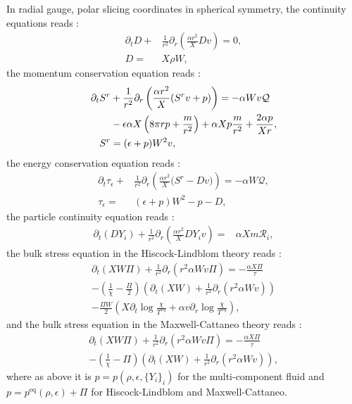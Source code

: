 \documentclass[aps,prd,twocolumn,a4paper,floatfix,nofootbib,superscriptaddress,nofootinbib]{revtex4}
\newcommand{\req}{\mathrm{eq}}
\begin{document}
In radial gauge, polar slicing coordinates in spherical symmetry, the continuity equations reads \cite{Romero96, OConnor10}:
%
\begin{align}
\label{eq:continuity-rho}
\partial_t D
+{}&\frac1{r^2}\partial_r\left(\frac{\alpha r^2}X Dv\right)=0,\\
\label{eq:def-d}
D={}& X\rho W,
\end{align}
%
the momentum conservation equation reads \cite{Romero96, OConnor10}:
%
\begin{align}
\label{eq:conservation-momentum}
\partial_t S^r{}&{}
+\frac1{r^2}\partial_r\left(\frac{\alpha r^2}X (S^rv + p)\right)=- \alpha W v {\mathcal Q}\notag\\
{}&{}-\epsilon\alpha X\left(8\pi rp + \frac{m}{r^2}\right)
+\alpha X p\frac{m}{r^2} + \frac{2\alpha p}{Xr},\\
\label{eq:def-sr}
S^r{}&{}=(\epsilon + p)W^2v,
\end{align}
%
the energy conservation equation reads \cite{Romero96, OConnor10}:
%
\begin{align}
\label{eq:conservation-energy}
\partial_t \tau_\epsilon
+{}&\frac1{r^2}\partial_r\left(\frac{\alpha r^2}X \big(S^r - Dv\big)\right)= -\alpha W \mathcal Q,\\
\label{eq:def-tau}
\tau_\epsilon={}&(\epsilon + p)W^2 - p - D,
\end{align}
%
the particle continuity equation reads \cite{OConnor10}:
\begin{align}
\label{eq:continuity-yi}
\partial_t (DY_i)
+\frac1{r^2}\partial_r\left(\frac{\alpha r^2}X DY_i v\right)={}&\alpha Xm\mathcal R_i,
\end{align}
%
the bulk stress equation in the Hiscock-Lindblom theory reads \cite{Camelio22a}:
%
\begin{multline}
\label{eq:pi-evol-hl}
\partial_t(XW\Pi) + \frac1{r^2}\partial_r\left(r^2\alpha Wv\Pi\right) = -\frac{\alpha X\Pi}{\tau}\\
-\left(\frac1\chi-\frac{\Pi}2\right)\left(\partial_t (XW) +\frac1{r^2}\partial_r(r^2\alpha Wv)\right)\\
-\frac{\Pi W}2\left(X\partial_t\log\frac\chi{T^\req}+\alpha v\partial_r\log\frac\chi{T^\req}\right),
\end{multline}
%
and the bulk stress equation in the Maxwell-Cattaneo theory reads \cite{Camelio22a}:
%
\begin{multline}
\label{eq:pi-evol}
\partial_t(XW\Pi) + \frac1{r^2}\partial_r\left(r^2\alpha Wv\Pi\right) = -\frac{\alpha X\Pi}{\tau}\\
-\left(\frac1\chi-\Pi\right)\left(\partial_t (XW) +\frac1{r^2}\partial_r(r^2\alpha Wv)\right),
\end{multline}
%
where as above it is $p=p(\rho,\epsilon,\{Y_i\}_i)$ for the multi-component
 fluid and $p=p^\req(\rho,\epsilon)+\Pi$ for Hiscock-Lindblom and
Maxwell-Cattaneo.
\end{document}
